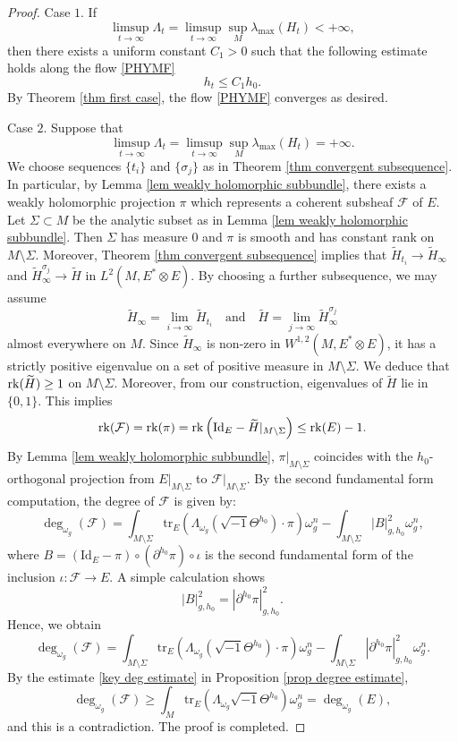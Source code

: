 \documentclass[12pt, reqno]{amsart}
\newcommand\cF{{\mathcal F}}
\newcommand{\rk}{{\rm rk}}
\theoremstyle{plain}
\theoremstyle{definition}
\newcommand{\sq}{\sqrt{-1}}
\newcommand{\p}{\partial}
\newcommand{\beq}{\begin{equation}}
\newcommand{\eeq}{\end{equation}}
\renewcommand{\tilde}{\widetilde}
\newcommand{\qtq}[1]{\quad\mbox{#1}\quad}
\newcommand{\ts}{\otimes}
\renewcommand{\>}{\rightarrow}
\renewcommand{\>}{\rightarrow}
\renewcommand{\p}{{\partial}}
\newcommand{\om}{\omega}
\renewcommand{\tilde}{\widetilde}
\newcommand{\tr}{\mathrm{tr}}
\numberwithin{equation}{section} %
\begin{document}
\begin{proof} Case $1$. If
    \beq \limsup_{t\>\infty}\Lambda_t = \limsup_{t\>\infty}\sup_M \lambda_{\max}(H_t)<+\infty,\eeq  then there exists a uniform constant $C_1>0$ such that  the following estimate holds along the flow \eqref{PHYMF}
    \beq h_t\leq C_1 h_0.\eeq
By Theorem \ref{thm first case},  the flow \eqref{PHYMF} converges as desired.

Case $2$.  Suppose that \beq \limsup_{t\>\infty}\Lambda_t = \limsup_{t\>\infty}\sup_M \lambda_{\max}(H_t)=+\infty.\eeq
    We choose sequences $\{t_i\}$ and $\{\sigma_j\}$ as in Theorem \ref{thm convergent subsequence}.
    In particular, by Lemma \ref{lem weakly holomorphic subbundle},  there exists a weakly holomorphic projection $\pi$ which  represents a coherent subsheaf $\cF$ of $E$.
    Let $\Sigma\subset M$ be the analytic subset as in Lemma \ref{lem weakly holomorphic subbundle}. Then $\Sigma$ has measure $0$ and $\pi$ is smooth and has constant rank on $M\setminus \Sigma$.
 Moreover, Theorem \ref{thm convergent subsequence} implies that $\tilde H_{t_i} \to \tilde H_\infty$ and $\tilde H_\infty^{\sigma_j}\to \tilde H$ in $L^2(M,E^*\ts E)$.
    By choosing a further subsequence, we may assume
    \beq
    \tilde H_\infty=\lim_{i\to\infty}\tilde H_{t_i} \qtq{and}
    \tilde H = \lim_{j\to\infty}\tilde H_\infty^{\sigma_j}
    \eeq
    almost everywhere on $M$.
    Since $\tilde H_\infty$ is non-zero in $W^{1,2}(M, E^*\ts E)$, it has a strictly positive eigenvalue on a set of positive measure in $M \setminus \Sigma$. We deduce that $\rk (\tilde H)\geq 1$ on $M\setminus \Sigma$. Moreover,
    from our construction,  eigenvalues of $\tilde H$ lie in $\{0,1\}$.
    This implies
    \beq
    \rk(\cF)=\rk(\pi)=\rk\left(\mathrm{Id}_E-\tilde H|_{M\setminus \Sigma}\right)\leq \rk(E)-1.
    \eeq
    By Lemma \ref{lem weakly holomorphic subbundle}, $\pi|_{M\setminus \Sigma}$ coincides with the $h_0$-orthogonal projection from $E|_{M\setminus \Sigma}$ to $\cF|_{M\setminus \Sigma}$.
   By the second fundamental form computation, the degree of $\cF$ is given by:
    \beq
    \deg_{\omega_g}(\cF)
    = \int_{M\setminus \Sigma} \tr_{E}\left(\Lambda_{\om_g}\left(\sq\Theta^{h_0}\right)\cdot \pi\right)\om_g^n
    -\int_{M\setminus \Sigma} \left|B\right|_{g,h_0}^2 \om_g^n,
    \eeq
where $B=\left(\mathrm{Id}_E-\pi\right)\circ \left(\p^{h_0}\pi\right)\circ \iota$ is the second fundamental form of the inclusion $\iota: \cF\>E$. A simple calculation shows
\beq |B|^2_{g,h_0}=|\p^{h_0}\pi|^2_{g, h_0}.\eeq
Hence, we obtain
    \beq
   \deg_{\omega_g}(\cF)
    = \int_{M\setminus \Sigma} \tr_{E}\left(\Lambda_{\om_g}\left(\sq\Theta^{h_0}\right)\cdot \pi\right)\om_g^n
    -\int_{M\setminus \Sigma} \left|\partial^{h_0} \pi\right|_{g,h_0}^2 \om_g^n.
    \eeq
    By the estimate \eqref{key deg estimate} in Proposition \ref{prop degree estimate},
    \beq
    \deg_{\omega_g}(\cF) \geq \int_M \tr_E\left(\Lambda_{\om_g}\sq\Theta^{h_0}\right)  \om_g^n= \deg_{\omega_g}(E),
    \eeq
    and this is a contradiction. The proof is completed.
\end{proof}
\end{document}
